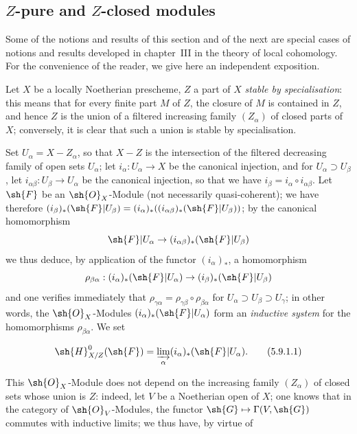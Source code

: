 
\subsection{\texorpdfstring{$Z$}{Z}-pure and \texorpdfstring{$Z$}{Z}-closed modules}
\label{subsection:IV.5.9}

Some of the notions and results of this section and of the next are special cases of notions and results developed in chapter~III in the theory of local cohomology.
For the convenience of the reader, we give here an independent exposition.

\begin{env}[5.9.1]
\label{IV.5.9.1}
Let $X$ be a locally Noetherian prescheme, $Z$ a part of $X$ \emph{stable by specialisation}: this means that for every finite part $M$ of $Z$, the closure of $M$ is contained in $Z$, and hence $Z$ is the union of a filtered increasing family $(Z_\alpha)$ of closed parts of $X$; conversely, it is clear that such a union is stable by specialisation.

Set $U_\alpha=X-Z_\alpha$, so that $X-Z$ is the intersection of the filtered decreasing family of open sets $U_\alpha$; let $i_\alpha:U_\alpha\to X$ be the canonical injection, and for $U_\alpha\supset U_\beta$, let $i_{\alpha\beta}:U_\beta\to U_\alpha$ be the canonical injection, so that we have $i_\beta=i_\alpha\circ i_{\alpha\beta}$.
Let $\sh{F}$ be an $\sh{O}_X$-Module (not necessarily quasi-coherent); we have therefore $(i_\beta)_*(\sh{F}|U_\beta)=(i_\alpha)_*((i_{\alpha\beta})_*(\sh{F}|U_\beta))$; by the canonical homomorphism 
\[
  \sh{F}|U_\alpha \to (i_{\alpha\beta})_*(\sh{F}|U_\beta)
\]
we thus deduce, by application of the functor $(i_\alpha)_*$, a homomorphism
\[
  \rho_{\beta\alpha}:(i_\alpha)_*(\sh{F}|U_\alpha)\to(i_\beta)_*(\sh{F}|U_\beta)
\]
and one verifies immediately that $\rho_{\gamma\alpha}=\rho_{\gamma\beta}\circ\rho_{\beta\alpha}$ for $U_\alpha\supset U_\beta\supset U_\gamma$; in other words, the $\sh{O}_X$-Modules $(i_\alpha)_*(\sh{F}|U_\alpha)$ form an \emph{inductive system} for the homomorphisms $\rho_{\beta\alpha}$.
We set
\end{env}

\begin{equation}
\label{IV.5.9.1.1}
\sh{H}^0_{X/Z}(\sh{F})=\varinjlim_\alpha (i_\alpha)_*(\sh{F}|U_\alpha). \tag{5.9.1.1}
\end{equation}

This $\sh{O}_X$-Module does not depend on the increasing family $(Z_\alpha)$ of closed sets whose union is $Z$: indeed, let $V$ be a Noetherian open of $X$; one knows  that in the category of $\sh{O}_V$-Modules, the functor $\sh{G}\mapsto\Gamma(V,\sh{G})$ commutes with inductive limits; we thus have, by virtue of 

